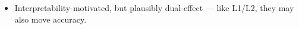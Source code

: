 \begin{itemize}
    \item Interpretability-motivated, but plausibly dual-effect — like L1/L2, they may also move accuracy. 

\end{itemize}
